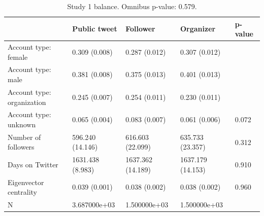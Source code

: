 \begin{table}

\caption{Study 1 balance. Omnibus p-value: 0.579.}
\centering
\begin{tabular}[t]{lllll}
\toprule
 & Public tweet & Follower & Organizer & p-value\\
\midrule
Account type: female & 0.309 (0.008) & 0.287 (0.012) & 0.307 (0.012) & \\
Account type: male & 0.381 (0.008) & 0.375 (0.013) & 0.401 (0.013) & \\
Account type: organization & 0.245 (0.007) & 0.254 (0.011) & 0.230 (0.011) & \\
Account type: unknown & 0.065 (0.004) & 0.083 (0.007) & 0.061 (0.006) & 0.072\\
Number of followers & 596.240 (14.146) & 616.603 (22.099) & 635.733 (23.357) & 0.312\\
\addlinespace
Days on Twitter & 1631.438 (8.983) & 1637.362 (14.189) & 1637.179 (14.153) & 0.910\\
Eigenvector centrality & 0.039 (0.001) & 0.038 (0.002) & 0.038 (0.002) & 0.960\\
N & 3.687000e+03 & 1.500000e+03 & 1.500000e+03 & \\
\bottomrule
\end{tabular}
\end{table}
